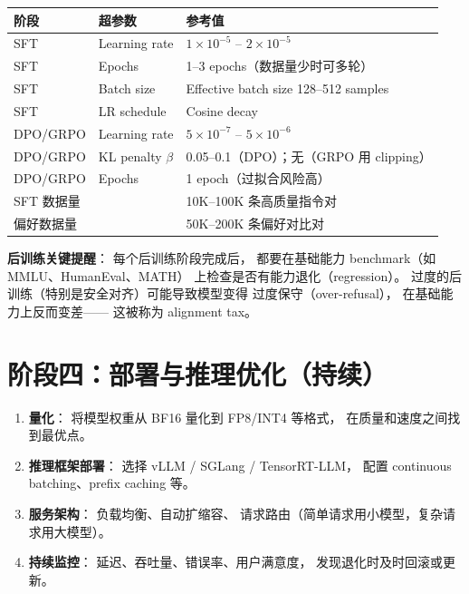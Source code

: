 \begin{corebox}[后训练超参数参考]
\begin{tabularx}{\linewidth}{l l X}
\toprule
\textbf{阶段} & \textbf{超参数} & \textbf{参考值} \\
\midrule
SFT & Learning rate & $1 \times 10^{-5}$ -- $2 \times 10^{-5}$ \\
SFT & Epochs        & 1--3 epochs（数据量少时可多轮） \\
SFT & Batch size    & Effective batch size 128--512 samples \\
SFT & LR schedule   & Cosine decay \\
\midrule
DPO/GRPO & Learning rate & $5 \times 10^{-7}$ -- $5 \times 10^{-6}$ \\
DPO/GRPO & KL penalty $\beta$ & 0.05--0.1（DPO）；无（GRPO 用 clipping） \\
DPO/GRPO & Epochs & 1 epoch（过拟合风险高） \\
\midrule
\multicolumn{2}{l}{SFT 数据量} & 10K--100K 条高质量指令对 \\
\multicolumn{2}{l}{偏好数据量} & 50K--200K 条偏好对比对 \\
\bottomrule
\end{tabularx}
\end{corebox}

\textbf{后训练关键提醒}：
每个后训练阶段完成后，
都要在基础能力 benchmark（如 MMLU、HumanEval、MATH）
上检查是否有能力退化（regression）。
过度的后训练（特别是安全对齐）可能导致模型变得
过度保守（over-refusal），
在基础能力上反而变差——
这被称为 alignment tax。

\section{阶段四：部署与推理优化（持续）}

\begin{enumerate}[noitemsep]
  \item \textbf{量化}：
        将模型权重从 BF16 量化到 FP8/INT4 等格式，
        在质量和速度之间找到最优点。
  \item \textbf{推理框架部署}：
        选择 vLLM / SGLang / TensorRT-LLM，
        配置 continuous batching、prefix caching 等。
  \item \textbf{服务架构}：
        负载均衡、自动扩缩容、
        请求路由（简单请求用小模型，复杂请求用大模型）。
  \item \textbf{持续监控}：
        延迟、吞吐量、错误率、用户满意度，
        发现退化时及时回滚或更新。
\end{enumerate}

